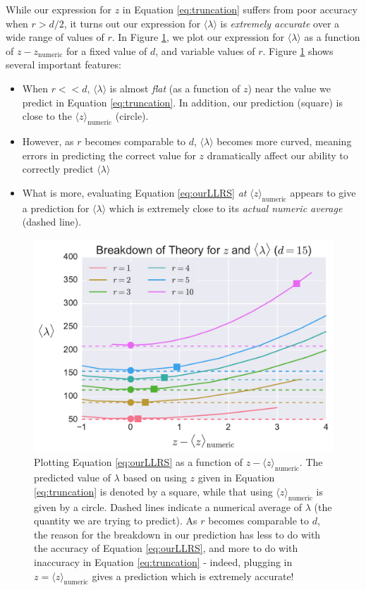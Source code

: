 \documentclass[aps,pra, twocolumn]{revtex4-1}
\begin{document}
While our expression for $z$ in Equation \eqref{eq:truncation} suffers from poor accuracy when $r > d/2$, it turns out our expression for $\langle \lambda \rangle$ is \emph{extremely accurate} over a wide range of values of $r$. In Figure \ref{fig:comparez}, we plot our expression for $\langle \lambda \rangle$ as a function of $z - z_{\mathrm{numeric}}$ for a fixed value of $d$, and variable values of $r$. Figure \ref{fig:comparez} shows several important features:
\begin{itemize}[nosep]
\item When $r << d$, $\langle \lambda \rangle$ is almost \emph{flat} (as a function of $z$) near the value we predict in Equation \eqref{eq:truncation}. In addition, our prediction (square) is close to the $\langle z \rangle_{\mathrm{numeric}}$ (circle).
\item However, as $r$ becomes comparable to $d$, $\langle \lambda \rangle$ becomes more curved, meaning errors in predicting the correct value for $z$ dramatically affect our ability to correctly predict $\langle \lambda \rangle$
\item What is more, evaluating Equation \eqref{eq:ourLLRS} \emph{at} $\langle z \rangle_{\mathrm{numeric}}$ appears to give a prediction for $\langle \lambda \rangle$ which is extremely close to its \emph{actual numeric average} (dashed line).
\end{itemize}

\begin{figure}[h]
 \includegraphics[width=\columnwidth]{Images/Figure_temp3.pdf}
 \caption{Plotting Equation \eqref{eq:ourLLRS} as a function of $z-\langle z \rangle_{\mathrm{numeric}}$. The predicted value of $\lambda$ based on using $z$ given in Equation \eqref{eq:truncation} is denoted by a square, while that using $\langle z \rangle_{\mathrm{numeric}}$ is given by a circle. Dashed lines indicate a numerical average of $\lambda$ (the quantity we are trying to predict). As $r$ becomes comparable to $d$, the reason for the breakdown in our prediction has less to do with the accuracy of Equation \eqref{eq:ourLLRS}, and more to do with inaccuracy in Equation \eqref{eq:truncation} - indeed, plugging in $z = \langle z \rangle_{\mathrm{numeric}}$ gives a prediction which is extremely accurate!}
 \label{fig:comparez}
\end{figure}
\end{document}
